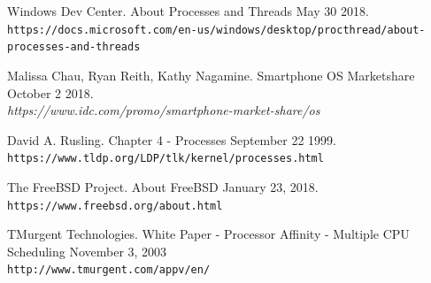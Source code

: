 \documentclass[onecolumn, draftclsnofoot,10pt, compsoc]{IEEEtran}
\begin{document}
	
\newpage
\begin{thebibliography}{10}
	Windows Dev Center.
	About Processes and Threads
	May 30 2018.
	\\\texttt{https://docs.microsoft.com/en-us/windows/desktop/procthread/about-processes-and-threads}

	Malissa Chau, Ryan Reith, Kathy Nagamine.
	Smartphone OS Marketshare
	October 2 2018.
	\\\textit{https://www.idc.com/promo/smartphone-market-share/os}

    David A. Rusling.
	Chapter 4 - Processes
	September 22 1999.
	\\\texttt{https://www.tldp.org/LDP/tlk/kernel/processes.html}

    The FreeBSD Project.
	About FreeBSD
	January 23, 2018.
	\\\texttt{https://www.freebsd.org/about.html}
	
    TMurgent Technologies.
	White Paper - Processor Affinity - Multiple CPU Scheduling
	November 3, 2003
	\\\texttt{http://www.tmurgent.com/appv/en/}


















\end{thebibliography}
\end{document}

